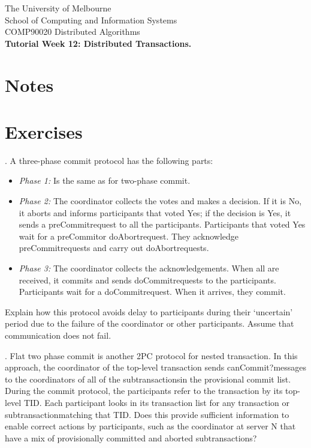 \documentclass[12pt]{article}
\newcounter{question}
\newcommand{\question}[1]{
    \stepcounter{question}
    \thequestion. #1 \hfill
}
\begin{document}
\begin{center}
    {\sc The University of Melbourne
        \\
        School of Computing and Information Systems
        \\
    COMP90020 Distributed Algorithms}
    \bigskip \\
    {\Large\bf Tutorial Week 12: Distributed Transactions.}
    \bigskip \\
\end{center}

\section*{Notes}

\section*{Exercises}

\setcounter{question}{50}

\question{A three-phase commit protocol has the following parts:}


\begin{itemize}
    \item \textit{Phase 1:} Is the same as for two-phase commit.
    \item \textit{Phase 2:} The coordinator collects the votes and makes a decision. If it is No, it aborts and informs participants that voted Yes; if the decision is Yes, it sends a preCommitrequest to all the participants. Participants that voted Yes wait for a preCommitor doAbortrequest. They acknowledge preCommitrequests and carry out doAbortrequests.
    \item \textit{Phase 3:} The coordinator collects the acknowledgements. When all are received, it commits and sends doCommitrequests to the participants. Participants wait for a doCommitrequest. When it arrives, they commit.
\end{itemize}

Explain how this protocol avoids delay to participants during their ‘uncertain’ period due to the failure of the coordinator or other participants. Assume that communication does not fail.

\question{Flat two phase commit is another 2PC protocol for nested transaction. In this approach, the coordinator of the top-level transaction sends canCommit?messages to the coordinators of all of the subtransactionsin the provisional commit list.  During the commit protocol, the participants refer to the transaction by its top-level TID. Each participant looks in its transaction list for any transaction or subtransactionmatching that TID. Does this provide sufficient information to enable correct actions by participants, such as the coordinator at server N that have a mix of provisionally committed and aborted subtransactions?}
\end{document}

